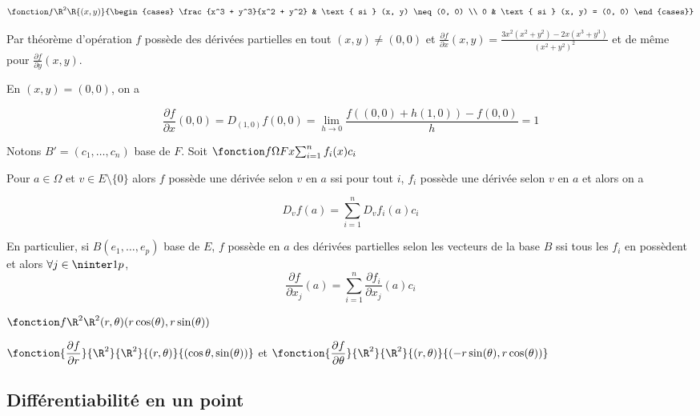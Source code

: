 \begin{exemple}
    $\fonction f {\R^2} \R {(x, y)}{\begin{cases}
        \frac{x^3 + y^3}{x^2 + y^2} & \text{ si } (x, y) \neq (0, 0) \\
        0 & \text{ si } (x, y) = (0, 0)
    \end{cases}}$

    Par théorème d'opération $f$ possède des dérivées partielles en tout $(x, y) \neq (0, 0)$
    et $\displaystyle \frac{\partial f}{\partial x} (x, y) = \frac{3x^2(x^2 + y^2) - 2x(x^3 + y^3)}{(x^2 + y^2)^2}$
    et de même pour $\frac{\partial f}{\partial y} (x, y)$. 

    En $(x, y) = (0, 0)$, on a 
    
    $$\displaystyle \frac{\partial f}{\partial x}(0, 0) = D_{(1, 0)}f(0, 0) = \lim_{h \to 0} \frac{f((0, 0) + h(1, 0)) - f(0, 0)} h = 1$$
\end{exemple}

\begin{remarque}
    Notons $B' = (c_1, \dots, c_n)$ base de $F$. Soit $\fonction f \Omega F x {\sum_{i = 1 }^{n } f_i(x)c_i}$

    Pour $a \in \Omega$ et $v \in E \setminus \{0\}$ alors $f$ possède une dérivée selon $v$ en $a$
    ssi pour tout $i$, $f_i$ possède une dérivée selon $v$ en $a$ et alors on a 

    $$D_vf(a) = \sum_{i = 1 }^{n } D_vf_i(a) c_i$$

    En particulier, si $B(e_1, \dots, e_p)$ base de $E$, $f$ possède en $a$ des dérivées partielles 
    selon les vecteurs de la base $B$ ssi tous les $f_i$ en possèdent et alors 
    $\forall j \in \ninter 1 p$, 
    $$\frac{\partial f}{\partial x_j} (a) = \sum_{i = 1 }^{n } \frac{\partial f_i}{\partial x_j} (a) c_i$$
\end{remarque}

\begin{exemple}
    $\fonction f {\R^2}{\R^2}{(r, \theta)}{(r \cos(\theta), r \sin (\theta))}$

    \avspace $\displaystyle \fonction{\frac{\partial f}{\partial r}}{\R^2}{\R^2}{(r, \theta)}{(\cos \theta, \sin(\theta))}$
    \quad et \quad  $\displaystyle \fonction{\frac{\partial f}{\partial \theta}}{\R^2}{\R^2}{(r, \theta)}{(-r \sin(\theta), r \cos(\theta))}$
\end{exemple}

\subsection{Différentiabilité en un point}

